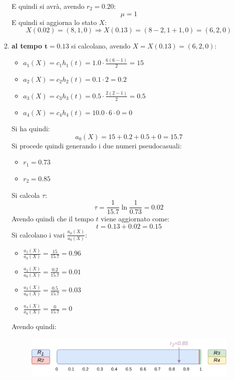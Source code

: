 \documentclass{article}
\begin{document}
\begin{enumerate}[label=\roman*)]
  E quindi si avrà, avendo $r_2=0.20$:
  \[\mu=1\]
  E quindi si aggiorna lo stato $X$:
  \[X(0.02) = (8,1,0) \Rightarrow X(0.13) = (8-2,1+1,0) = (6,2,0)\]
  \newpage
  \item \textbf{al tempo $\mathbf{t=0.13}$} si calcolano, avendo
  $X=X(0.13)=(6,2,0)$: 
  \begin{multicols}{2}
    \begin{itemize}
      \item $a_1(X)=c_1h_1(t)=1.0\cdot\frac{6(6-1)}{2}=15$
      \item $a_2(X)=c_2h_2(t)=0.1\cdot 2=0.2$
      \item $a_3(X)=c_3h_3(t)=0.5\cdot \frac{2(2-1)}{2}=0.5$
      \item $a_4(X)=c_4h_4(t)=10.0\cdot 6 \cdot 0=0$
    \end{itemize}
  \end{multicols}
  Si ha quindi:
  \[a_0(X)=15+0.2+0.5+0=15.7\]
  Si procede quindi generando i due numeri pseudocasuali:
  \begin{multicols}{2}
    \begin{itemize}
      \item $r_1=0.73$
      \item $r_2=0.85$
    \end{itemize}
  \end{multicols}
  Si calcola $\tau$:
  \[\tau=\frac{1}{15.7}\ln\frac{1}{0.73}=0.02\]
  Avendo quindi che il tempo $t$ viene aggiornato come:
  \[t=0.13+0.02=0.15\]
  Si calcolano i vari $\frac{a_\mu(X)}{a_0(X)}$:
  \begin{multicols}{2}
    \begin{itemize}
      \item $\frac{a_1(X)}{a_0(X)}=\frac{15}{15.7}=0.96$
      \item $\frac{a_2(X)}{a_0(X)}=\frac{0.2}{15.7}=0.01$
      \item $\frac{a_3(X)}{a_0(X)}=\frac{0.5}{15.7}=0.03$
      \item $\frac{a_4(X)}{a_0(X)}=\frac{0}{15.7}=0$
    \end{itemize}
  \end{multicols}
  Avendo quindi:
  \begin{figure}[H]
    \centering
    \includegraphics[scale = 0.8]{img/t3.pdf}

\end{figure}
\end{enumerate}
\end{document}
